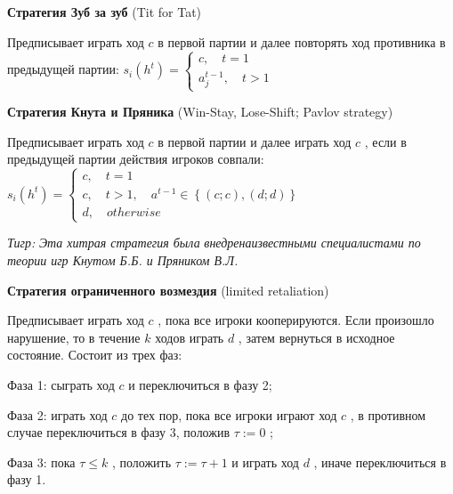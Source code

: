 \documentclass[pdftex,12pt,a4paper]{article}
\begin{document}
{\bf Стратегия Зуб за зуб} (Tit for Tat)

Предписывает играть ход  $c$  в первой партии и далее повторять ход противника в предыдущей партии:  $s_{i} \left(h^{t} \right)=\left\{\begin{array}{l} {c,\quad t=1} \\ {a_{j}^{t-1} ,\quad t>1} \end{array}\right. $

{\bf Стратегия Кнута и Пряника} (Win-Stay, Lose-Shift; Pavlov strategy)

Предписывает играть ход  $c$  в первой партии и далее играть ход  $c$ , если в предыдущей партии действия игроков совпали:  $s_{i} \left(h^{t} \right)=\left\{\begin{array}{l} {c,\quad t=1} \\ {c,\quad t>1,\quad a^{t-1} \in \left\{\left(c;c\right),\left(d;d\right)\right\}} \\ {d,\quad otherwise} \end{array}\right. $

{\it Тигр: }{\it Э}{\it та хитрая стратегия была }{\it внедрена}{\it  известными специалистами по теории игр Кнутом Б.Б. и Пряником В.Л.}

{\bf Стратегия ограниченного возмездия} (limited retaliation)

Предписывает играть ход  $c$ , пока все игроки кооперируются. Если произошло нарушение, то в течение  $k$  ходов играть  $d$ , затем вернуться в исходное состояние. Состоит из трех фаз:

Фаза 1: сыграть ход  $c$  и переключиться в фазу 2;

Фаза 2: играть ход  $c$  до тех пор, пока все игроки играют ход  $c$ , в противном случае переключиться в фазу 3, положив  $\tau :=0$ ;

Фаза 3: пока  $\tau \le k$ , положить  $\tau :=\tau +1$  и играть ход  $d$ , иначе переключиться в фазу 1.
\end{document}
